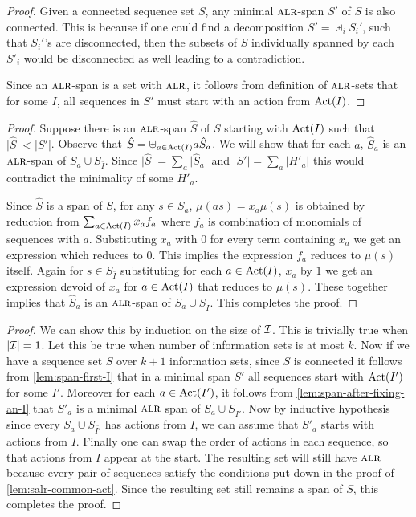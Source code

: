 \spanFirstInfo*

\begin{proof}
Given a connected sequence set $S$, any minimal $\textsc{alr}$-span $S'$ of $S$ is also connected. This is because if one could find a decomposition $S' = \uplus_i S_i'$, such that $S_i'$'s are disconnected, then the subsets of $S$ individually spanned by each $S'_i$ would be disconnected as well leading to a contradiction. 


Since an $\textsc{alr}$-span is a set with $\textsc{alr}$, it follows from definition of $\textsc{alr}$-sets that for some $I$, all sequences in $S'$ must start with an action from $\operatorname{Act}(I)$. 
\end{proof}



\spanAfterFixingInfo*

\begin{proof}
Suppose there is an $\textsc{alr}$-span $\hat{S}$ of $S$ starting with $\operatorname{Act}(I)$ such that $\lvert \hat{S} \rvert < \lvert S' \rvert$. 
Observe that $\hat{S} = \uplus_{a \in \operatorname{Act}(I)}a\hat{S}_a$. 
We will show that for each $a$, $\hat{S}_a$ is an $\textsc{alr}$-span of $S_a \cup S_{\bar{I}}$. Since $\lvert \hat{S} \rvert = \sum_{a} \lvert \hat{S}_a \rvert$ and $\lvert S' \rvert = \sum_{a} \lvert H'_a \rvert$ this would contradict the minimality of some $H'_a$. 


Since $\hat{S}$ is a span of $S$, for any $s \in S_a$, $\mu(as) = x_a\mu(s)$ is obtained by reduction from $\sum_{a \in \operatorname{Act}(I)}x_af_a$ where $f_a$ is combination of monomials of sequences with $a$. Substituting $x_a$ with $0$ for every term containing $x_a$ we get an expression which reduces to $0$. This implies the expression $f_a$ reduces to $\mu(s)$ itself. Again for $s \in S_{\bar{I}}$ substituting for each $a \in \operatorname{Act}(I)$, $x_a$ by $1$ we get an expression devoid of $x_a$ for $a \in \operatorname{Act}(I)$ that reduces to $\mu(s)$. 
These together implies that $\hat{S}_a$ is an $\textsc{alr}$-span of $S_a \cup S_{\bar{I}}$.
This completes the proof.  
\end{proof}

\spanFindFirstInfo*

\begin{proof}
We can show this by induction on the size of $\mathcal{I}$. This is trivially true when $\lvert \mathcal{I} \rvert = 1$. Let this be true when number of information sets is at most $k$. Now if we have a sequence set $S$ over $k+1$ information sets, since $S$ is connected it follows from \cref{lem:span-first-I} that in a minimal span $S'$ all sequences start with $\operatorname{Act}(I')$ for some $I'$. Moreover for each $a \in \operatorname{Act}(I')$, it follows from \cref{lem:span-after-fixing-an-I} that $S'_a$ is a minimal $\textsc{alr}$ span of $S_a \cup S_{\bar{I'}}$. Now by inductive hypothesis since every $S_a \cup S_{\bar{I'}}$ has actions from $I$, we can assume that $S'_a$ starts with actions from $I$. Finally one can swap the order of actions in each sequence, so that actions from $I$ appear at the start. The resulting set will still have $\textsc{alr}$ because every pair of sequences satisfy the conditions put down in the proof of \cref{lem:salr-common-act}. Since the resulting set still remains a span of $S$, this completes the proof.  
\end{proof}



